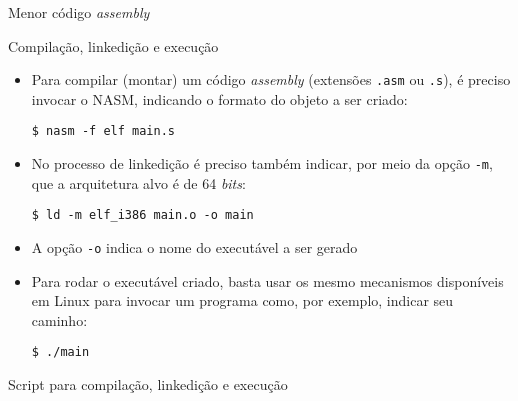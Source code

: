 \begin{frame}[fragile]{Menor código {\it assembly}}


\end{frame}

\begin{frame}[fragile]{Compilação, linkedição e execução}

    \begin{itemize}
        \item Para compilar (montar) um código \textit{assembly} (extensões \texttt{.asm} ou 
            \texttt{.s}), é preciso invocar o NASM, indicando o formato do objeto a ser criado:

        \begin{center}
            \verb|$ nasm -f elf main.s|
        \end{center}
        
        \item No processo de linkedição é preciso também indicar, por meio da opção \texttt{-m},
            que a arquitetura alvo é de 64 \textit{bits}:

        \begin{center}
            \verb|$ ld -m elf_i386 main.o -o main|
        \end{center}

        \item A opção \texttt{-o} indica o nome do executável a ser gerado

        \item Para rodar o executável criado, basta usar os mesmo mecanismos disponíveis em Linux
            para invocar um programa como, por exemplo, indicar seu caminho:
        
        \begin{center}
            \verb|$ ./main|
        \end{center}
    \end{itemize}

\end{frame}

\begin{frame}[fragile]{Script para compilação, linkedição e execução}


\end{frame}
